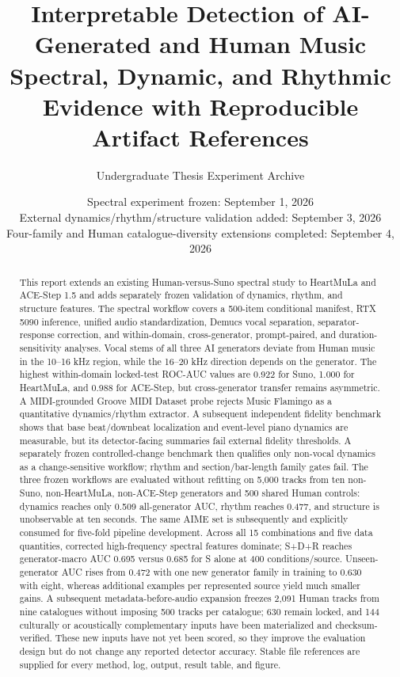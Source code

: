 \documentclass[11pt,a4paper]{article}
\title{Interpretable Detection of AI-Generated and Human Music\\
\large Spectral, Dynamic, and Rhythmic Evidence with Reproducible Artifact References}
\author{Undergraduate Thesis Experiment Archive}
\date{Spectral experiment frozen: September 1, 2026\\External dynamics/rhythm/structure validation added: September 3, 2026\\Four-family and Human catalogue-diversity extensions completed: September 4, 2026}
\begin{document}
\maketitle

\begin{abstract}
This report extends an existing Human-versus-Suno spectral study to HeartMuLa and ACE-Step 1.5 and adds separately frozen validation of dynamics, rhythm, and structure features. The spectral workflow covers a 500-item conditional manifest, RTX 5090 inference, unified audio standardization, Demucs vocal separation, separator-response correction, and within-domain, cross-generator, prompt-paired, and duration-sensitivity analyses. Vocal stems of all three AI generators deviate from Human music in the 10--16 kHz region, while the 16--20 kHz direction depends on the generator. The highest within-domain locked-test ROC-AUC values are 0.922 for Suno, 1.000 for HeartMuLa, and 0.988 for ACE-Step, but cross-generator transfer remains asymmetric. A MIDI-grounded Groove MIDI Dataset probe rejects Music Flamingo as a quantitative dynamics/rhythm extractor. A subsequent independent fidelity benchmark shows that base beat/downbeat localization and event-level piano dynamics are measurable, but its detector-facing summaries fail external fidelity thresholds. A separately frozen controlled-change benchmark then qualifies only non-vocal dynamics as a change-sensitive workflow; rhythm and section/bar-length family gates fail. The three frozen workflows are evaluated without refitting on 5,000 tracks from ten non-Suno, non-HeartMuLa, non-ACE-Step generators and 500 shared Human controls: dynamics reaches only 0.509 all-generator AUC, rhythm reaches 0.477, and structure is unobservable at ten seconds. The same AIME set is subsequently and explicitly consumed for five-fold pipeline development. Across all 15 combinations and five data quantities, corrected high-frequency spectral features dominate; S+D+R reaches generator-macro AUC 0.695 versus 0.685 for S alone at 400 conditions/source. Unseen-generator AUC rises from 0.472 with one new generator family in training to 0.630 with eight, whereas additional examples per represented source yield much smaller gains. A subsequent metadata-before-audio expansion freezes 2,091 Human tracks from nine catalogues without imposing 500 tracks per catalogue; 630 remain locked, and 144 culturally or acoustically complementary inputs have been materialized and checksum-verified. These new inputs have not yet been scored, so they improve the evaluation design but do not change any reported detector accuracy. Stable file references are supplied for every method, log, output, result table, and figure.
\end{abstract}
\end{document}
